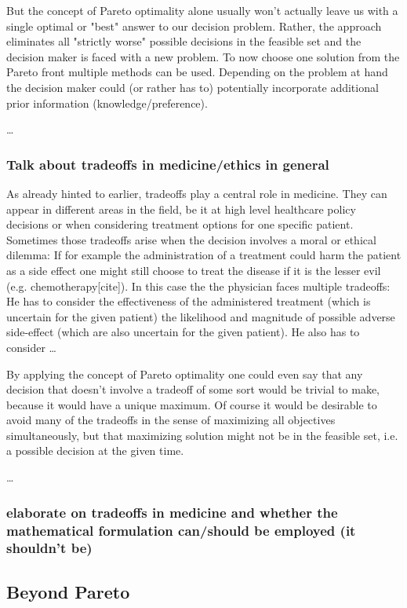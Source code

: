 	But the concept of Pareto optimality alone usually won't actually leave us with a single optimal or "best" answer to our decision problem.
	Rather, the approach eliminates all "strictly worse" possible decisions in the feasible set and the decision maker is faced with a new problem.
	To now choose one solution from the Pareto front multiple methods can be used.
	Depending on the problem at hand the decision maker could (or rather has to) potentially incorporate additional prior information (knowledge/preference).

	\dots


	\subsubsection{Talk about tradeoffs in medicine/ethics in general}
	As already hinted to earlier, tradeoffs play a central role in medicine.
	They can appear in different areas in the field, be it at high level healthcare policy decisions or when considering treatment options for one specific patient.
	Sometimes those tradeoffs arise when the decision involves a moral or ethical dilemma:
	If for example the administration of a treatment could harm the patient as a side effect one might still choose to treat the disease if it is the lesser evil (e.g. chemotherapy[cite]).
	In this case the the physician faces multiple tradeoffs:
	He has to consider the effectiveness of the administered treatment (which is uncertain for the given patient) the likelihood and magnitude of possible adverse side-effect (which are also uncertain for the given patient).
	He also has to consider \dots
	
	By applying the concept of Pareto optimality one could even say that any decision that doesn't involve a tradeoff of some sort would be trivial to make, because it would have a unique maximum.
	Of course it would be desirable to avoid many of the tradeoffs in the sense of maximizing all objectives simultaneously, but that maximizing solution might not be in the feasible set, i.e. a possible decision at the given time.

	\dots

	

	\subsubsection{elaborate on tradeoffs in medicine and whether the mathematical formulation can/should be employed (it shouldn't be)}

\subsection{Beyond Pareto}
